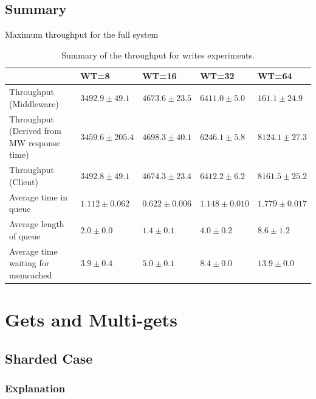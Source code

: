 \documentclass[11pt,a4paper]{article}
\begin{document}
\subsection{Summary} \label{sec:tpfw-summary}
\begin{table}[h]
\small
\centering
{Maximum throughput for the full system}
\begin{tabular}{|p{5.1cm}|p{2.1cm}|p{1.9cm}|p{1.9cm}|p{1.9cm}|}
\hline                                            & WT=8               & WT=16             & WT=32             & WT=64             \\ 
\hline Throughput (Middleware)                    & $3492.9 \pm 49.1$  & $4673.6 \pm 23.5$ & $6411.0 \pm 5.0$  & $161.1 \pm 24.9$  \\ 
\hline Throughput (Derived from MW response time) & $3459.6 \pm 205.4$ & $4698.3 \pm 40.1$ & $6246.1 \pm 5.8$  & $8124.1 \pm 27.3$ \\ 
\hline Throughput (Client)                        & $3492.8 \pm 49.1$  & $4674.3 \pm 23.4$ & $6412.2 \pm 6.2$  & $8161.5 \pm 25.2$ \\ 
\hline Average time in queue                      & $1.112 \pm 0.062$  & $0.622 \pm 0.006$ & $1.148 \pm 0.010$ & $1.779 \pm 0.017$ \\ 
\hline Average length of queue                    & $2.0 \pm 0.0$      & $1.4 \pm 0.1$     & $4.0 \pm 0.2$     & $8.6 \pm 1.2$     \\ 
\hline Average time waiting for memcached         & $3.9 \pm 0.4$      & $5.0 \pm 0.1$     & $8.4 \pm 0.0$     & $13.9 \pm 0.0$    \\ 
\hline 
\end{tabular}
\caption{Summary of the throughput for writes experiments.} \label{tab:tpfw-summary}
\end{table}

\section{Gets and Multi-gets} \label{sec:gmg}

\subsection{Sharded Case} \label{sec:gmg-true}

\subsubsection{Explanation} \label{sec:gmg-true-exp}
\end{document}
